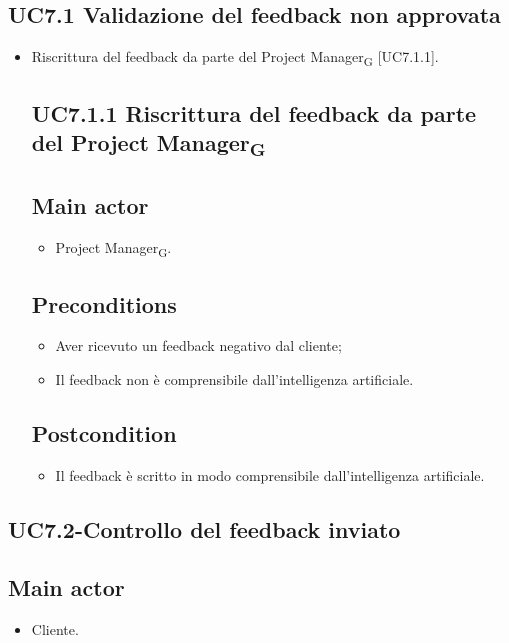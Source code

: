 \documentclass{article}
\begin{document}
    \subsection{UC7.1 Validazione del feedback non approvata}
    \begin{itemize}
        \item Riscrittura del feedback da parte del Project Manager\textsubscript{G}  [UC7.1.1].
        \subsection*{UC7.1.1 Riscrittura del feedback da parte del Project Manager\textsubscript{G} }
     \subsection*{Main actor}
         \begin{itemize}
             \item Project Manager\textsubscript{G}.
         \end{itemize}
     \subsection*{Preconditions} 
        \begin{itemize}
            \item Aver ricevuto un feedback negativo dal cliente;
            \item Il feedback non è comprensibile dall'intelligenza artificiale.
        \end{itemize}
        \subsection*{Postcondition} 
        \begin{itemize}
            \item Il feedback è scritto in modo comprensibile dall'intelligenza artificiale.
        \end{itemize}
    \end{itemize}
    
\subsection{UC7.2-Controllo del feedback inviato}
    
     \subsection*{Main actor}
         \begin{itemize}
             \item Cliente.
         \end{itemize}
\end{document}
